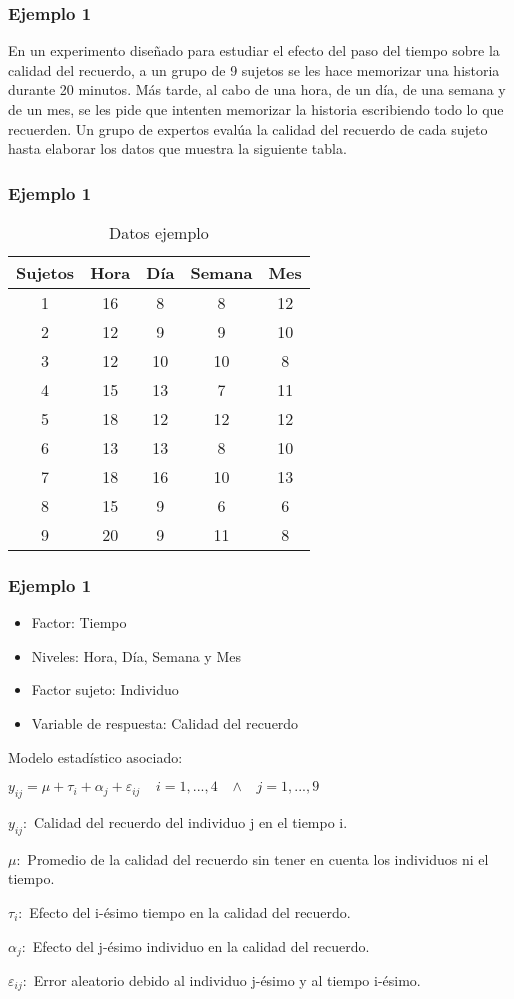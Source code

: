 \documentclass[12pt]{beamer}
\begin{document}
\begin{frame}
\frametitle{Ejemplo 1}
En un experimento diseñado para estudiar el efecto del paso del tiempo sobre la calidad del recuerdo, a un grupo de 9 sujetos se les hace memorizar una historia durante 20 minutos. Más tarde, al cabo de una hora, de un día, de una semana y de un mes, se les pide que intenten memorizar la historia escribiendo todo lo que recuerden. Un grupo de expertos evalúa la calidad del recuerdo de cada sujeto hasta elaborar los datos que muestra la siguiente tabla.
\end{frame}

\begin{frame}
\frametitle{Ejemplo 1}
\begin{table}[htbp]
  \centering
\resizebox{10cm}{!} {
\begin{tabular}{|c|c|c|c|c|}
\hline 
\textbf{Sujetos} & \textbf{Hora} & \textbf{Día} & \textbf{Semana} & \textbf{Mes}\\ 
\hline 
1 & 16 & 8 & 8 & 12\\
2 & 12 &9& 9& 10\\
3 &12 &10& 10& 8\\
4 &15 &13& 7& 11\\
5 &18 &12 &12& 12\\
6 &13 & 13 & 8 &10\\
7 & 18 & 16 & 10 & 13\\
8 & 15 & 9 & 6 & 6 \\
9 & 20 & 9 & 11 & 8\\
\hline 
\end{tabular} 
}
\caption{Datos ejemplo}
\label{tab:addlabel}%
\end{table}%
\end{frame}

\begin{frame}
\frametitle{Ejemplo 1}
\begin{itemize}
\item Factor: Tiempo
\item Niveles: Hora, Día, Semana y Mes
\item Factor sujeto: Individuo
\item Variable de respuesta: Calidad del recuerdo
\end{itemize}
Modelo estadístico asociado:
\begin{center}
$y_{ij}=\mu+\tau_i+\alpha_j+\varepsilon_{ij} \;\;\;\; i=1,...,4 \;\;\;  \wedge \;\;\; j=1,...,9$
\end{center}
$y_{ij}:$ Calidad del recuerdo del individuo j en el tiempo i.

$\mu:$ Promedio de la calidad del recuerdo sin tener en cuenta los individuos ni el tiempo.

$\tau_i:$ Efecto del i-ésimo tiempo en la calidad del recuerdo.

$\alpha_j:$ Efecto del j-ésimo individuo en la calidad del recuerdo.

$\varepsilon_{ij}:$ Error aleatorio debido al individuo j-ésimo y al tiempo i-ésimo.
\end{frame}
\end{document}
